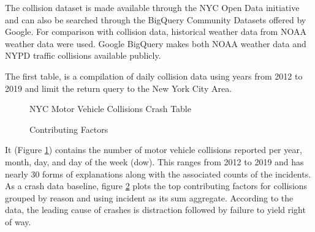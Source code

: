 \documentclass[conference]{IEEEtran}
\begin{document}
The collision dataset is made available through the NYC Open Data initiative and can also be searched through the BigQuery Community Datasets offered by Google. For comparison with collision data, historical weather data from NOAA weather data were used.  Google BigQuery makes both NOAA weather data and NYPD traffic collisions available publicly. 

The first table, is a compilation of daily collision data using years from 2012 to 2019 and limit the return query to the New York City Area. 
\begin{figure}[bth]
	\centering
	\caption{NYC Motor Vehicle Collisions Crash Table}
	\label{fig:mvtable}
\end{figure}
\begin{figure}[bth]
	\centering
	\caption{Contributing Factors}
	\label{fig:crashPlot}
\end{figure}
It (Figure \ref{fig:mvtable}) contains the number of motor vehicle collisions reported per year, month, day, and day of the week (dow). This ranges from 2012 to 2019 and has nearly 30 forms of explanations along with the associated counts of the incidents.  As a crash data baseline, figure \ref{fig:crashPlot} plots the top contributing factors for collisions grouped by reason and using incident as its sum aggregate. According to the data, the leading cause of crashes is distraction followed by failure to yield right of way. 
\end{document}
